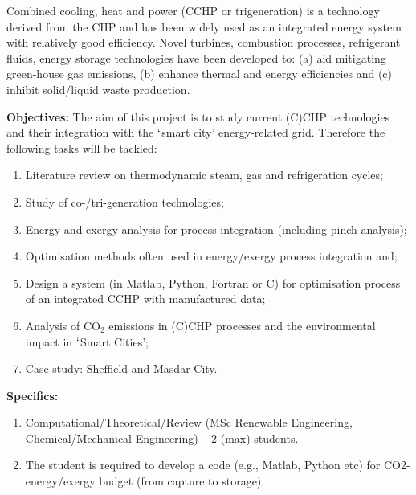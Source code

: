 \documentclass[12pts,a4paper,amsmath,amssymb,floatfix]{article}%
\newcommand{\Renew}{MSc Renewable Engineering, Chemical/Mechanical Engineering}
\begin{document}
\begin{enumerate}[label=\bfseries Project: \arabic*:]
Combined cooling, heat and power (CCHP or trigeneration) is a technology derived from the CHP and has been widely used as an integrated energy system with relatively good efficiency. Novel turbines, combustion processes, refrigerant fluids, energy storage technologies have been developed to: (a) aid mitigating green-house gas emissions, (b) enhance thermal and energy efficiencies and (c) inhibit solid/liquid waste production.

\noindent
{\bf Objectives:} The aim of this project is to study current (C)CHP technologies and their integration with the $\lq$smart city’ energy-related grid. Therefore the following tasks will be tackled:
\begin{enumerate}
\item Literature review on thermodynamic steam, gas and refrigeration cycles;
\item Study of co-/tri-generation technologies;
\item Energy and exergy analysis for process integration (including pinch analysis);
\item Optimisation methods often used in energy/exergy process integration and;
\item Design a system (in Matlab, Python, Fortran or C) for optimisation process of an integrated CCHP with manufactured data;
\item Analysis of CO$_{2}$ emissions in (C)CHP processes and the environmental impact in $\lq$Smart Cities';
\item Case study: Sheffield and Masdar City.
\end{enumerate}


\noindent
{\bf Specifics:} 
\begin{enumerate}
\item Computational/Theoretical/Review (\Renew) -- 2 (max) students. 
\item The student is required to develop a code (e.g., Matlab, Python etc) for CO2-energy/exergy budget (from capture to storage).
\end{enumerate} 


\end{enumerate}
\end{document}
